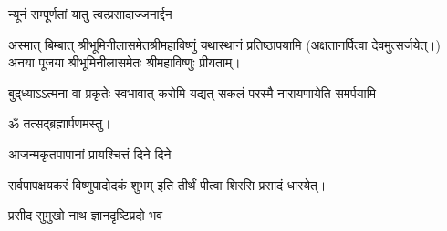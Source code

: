 \begin{center}
{न्यूनं सम्पूर्णतां यातु त्वत्प्रसादाज्जनार्द्दन}\medskip

अस्मात् बिम्बात् श्रीभूमिनीलासमेतश्रीमहाविष्णुं यथास्थानं प्रतिष्ठापयामि (अक्षतानर्पित्वा देवमुत्सर्जयेत्।)\\
अनया पूजया श्रीभूमिनीलासमेतः श्रीमहाविष्णुः प्रीयताम्।\medskip

{बुद्‌ध्याऽऽत्मना वा प्रकृतेः स्वभावात्}
{करोमि यद्यत् सकलं परस्मै}
{नारायणायेति समर्पयामि}


ॐ तत्सद्ब्रह्मार्पणमस्तु।\medskip

{आजन्मकृतपापानां प्रायश्चित्तं दिने दिने}

{सर्वपापक्षयकरं विष्णुपादोदकं शुभम्}
 इति तीर्थं पीत्वा शिरसि प्रसादं धारयेत्।

\end{center}


{प्रसीद सुमुखो नाथ ज्ञानदृष्टिप्रदो भव}

\closesection

